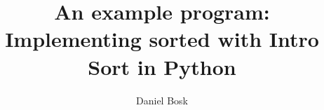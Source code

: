 \documentclass[a4paper,10pt,article,oneside,oldfontcommands]{memoir}
\begin{document}
\title{%
  An example program:
  Implementing sorted with Intro Sort in Python
}
\author{%
  Daniel Bosk
}


\begin{frame}
  \maketitle
\end{frame}

\begin{abstract}
  
\end{abstract}

\clearpage

\begin{frame}
\end{frame}

\clearpage


\end{document}
